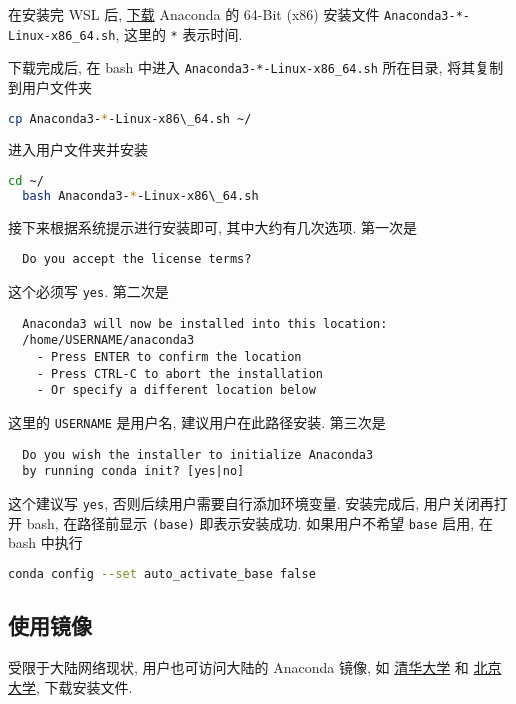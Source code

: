 \documentclass[fontset=founder]{ctexrep}
\begin{document}
在安装完 WSL 后,
\href{https://www.anaconda.com/products/distribution#Downloads}{下载}
Anaconda 的 64-Bit (x86) 安装文件 \texttt{Anaconda3-*-Linux-x86\_64.sh},
这里的 \texttt{*} 表示时间.

下载完成后,
在 \textsf{bash} 中进入 \texttt{Anaconda3-*-Linux-x86\_64.sh} 所在目录,
将其复制到用户文件夹
\begin{lstlisting}[language=bash]
  cp Anaconda3-*-Linux-x86\_64.sh ~/
\end{lstlisting}
进入用户文件夹并安装
\begin{lstlisting}[language=bash]
  cd ~/
  bash Anaconda3-*-Linux-x86\_64.sh
\end{lstlisting}
接下来根据系统提示进行安装即可,
其中大约有几次选项.
第一次是
\begin{lstlisting}
  Do you accept the license terms?
\end{lstlisting}
这个必须写 \texttt{yes}.
第二次是
\begin{lstlisting}
  Anaconda3 will now be installed into this location:
  /home/USERNAME/anaconda3
    - Press ENTER to confirm the location
    - Press CTRL-C to abort the installation
    - Or specify a different location below
\end{lstlisting}
这里的 \texttt{USERNAME} 是用户名,
建议用户在此路径安装.
第三次是
\begin{lstlisting}
  Do you wish the installer to initialize Anaconda3
  by running conda init? [yes|no]
\end{lstlisting}
这个建议写 \texttt{yes},
否则后续用户需要自行添加环境变量.
安装完成后,
用户关闭再打开 \textsf{bash},
在路径前显示 \texttt{(base)} 即表示安装成功.
如果用户不希望 \texttt{base} 启用,
在 \textsf{bash} 中执行
\begin{lstlisting}[language=bash]
  conda config --set auto_activate_base false
\end{lstlisting}

\subsection{使用镜像}

受限于大陆网络现状,
用户也可访问大陆的 Anaconda 镜像,
如%
\href{https://mirrors.tuna.tsinghua.edu.cn/anaconda/archive/}{清华大学}%
和%
\href{https://mirrors.pku.edu.cn/anaconda/archive/}{北京大学},
下载安装文件.
\end{document}
